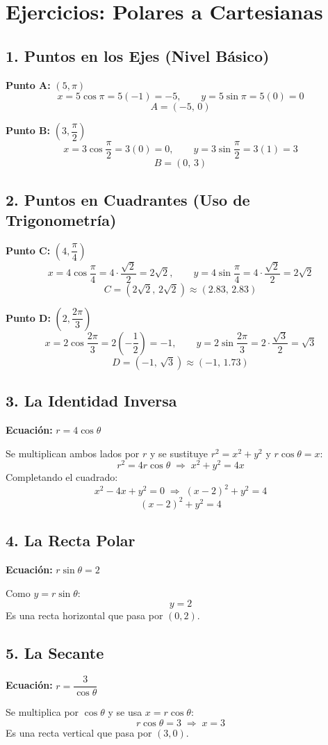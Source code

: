\documentclass[50pt]{article}
\begin{document}
\section{Ejercicios: Polares a Cartesianas}
 
 
\subsection*{1. Puntos en los Ejes (Nivel Básico)}
 
\textbf{Punto A:} $(5,\pi)$
\[
x=5\cos\pi=5(-1)=-5,\qquad y=5\sin\pi=5(0)=0
\]
\[
\boxed{A=(-5,\,0)}
\]
 
\textbf{Punto B:} $\left(3,\dfrac{\pi}{2}\right)$
\[
x=3\cos\frac{\pi}{2}=3(0)=0,\qquad y=3\sin\frac{\pi}{2}=3(1)=3
\]
\[
\boxed{B=(0,\,3)}
\]
 
\subsection*{2. Puntos en Cuadrantes (Uso de Trigonometría)}
 
\textbf{Punto C:} $\left(4,\dfrac{\pi}{4}\right)$
\[
x=4\cos\frac{\pi}{4}=4\cdot\frac{\sqrt2}{2}=2\sqrt2,\qquad
y=4\sin\frac{\pi}{4}=4\cdot\frac{\sqrt2}{2}=2\sqrt2
\]
\[
\boxed{C=\left(2\sqrt2,\,2\sqrt2\right)\approx(2.83,\,2.83)}
\]
 
\textbf{Punto D:} $\left(2,\dfrac{2\pi}{3}\right)$
\[
x=2\cos\frac{2\pi}{3}=2\left(-\frac12\right)=-1,\qquad
y=2\sin\frac{2\pi}{3}=2\cdot\frac{\sqrt3}{2}=\sqrt3
\]
\[
\boxed{D=\left(-1,\,\sqrt3\right)\approx(-1,\,1.73)}
\]
 
\subsection*{3. La Identidad Inversa}
 
\textbf{Ecuación:} $r=4\cos\theta$
 
Se multiplican ambos lados por $r$ y se sustituye $r^2=x^2+y^2$ y $r\cos\theta=x$:
\[
r^2=4r\cos\theta\;\Rightarrow\;x^2+y^2=4x
\]
Completando el cuadrado:
\[
x^2-4x+y^2=0\;\Rightarrow\;(x-2)^2+y^2=4
\]
\[
\boxed{(x-2)^2+y^2=4}
\]

 
\subsection*{4. La Recta Polar}
 
\textbf{Ecuación:} $r\sin\theta=2$
 
Como $y=r\sin\theta$:
\[
\boxed{y=2}
\]
Es una recta horizontal que pasa por $(0,2)$.
 
\subsection*{5. La Secante}
 
\textbf{Ecuación:} $r=\dfrac{3}{\cos\theta}$
 
Se multiplica por $\cos\theta$ y se usa $x=r\cos\theta$:
\[
r\cos\theta=3\;\Rightarrow\;\boxed{x=3}
\]
Es una recta vertical que pasa por $(3,0)$.
 
\end{document}
